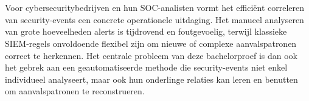 
\section{}%
\label{sec:probleemstelling}

Voor cybersecuritybedrijven en hun SOC-analisten vormt het efficiënt correleren van security-events een concrete operationele uitdaging. Het manueel analyseren van grote hoeveelheden alerts is tijdrovend en foutgevoelig, terwijl klassieke SIEM-regels onvoldoende flexibel zijn om nieuwe of complexe aanvalspatronen correct te herkennen.
\newline
\newline
Het centrale probleem van deze bachelorproef is dan ook het gebrek aan een geautomatiseerde methode die security-events niet enkel individueel analyseert, maar ook hun onderlinge relaties kan leren en benutten om aanvalspatronen te reconstrueren.


\section{}%
\label{sec:onderzoeksvraag}

